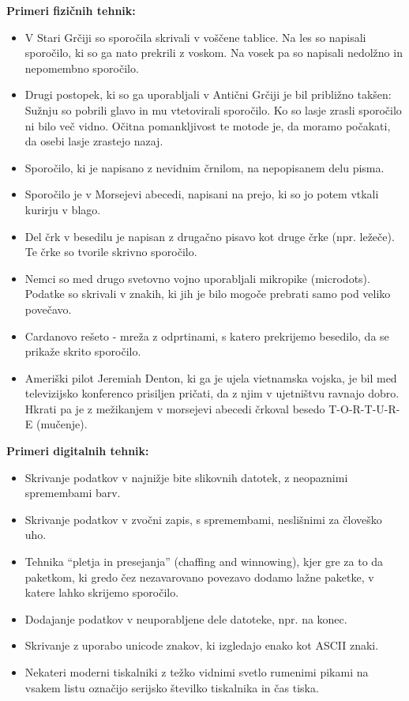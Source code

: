 \documentclass[a4paper, 12pt]{article}
\begin{document}
        \textbf{Primeri fizičnih tehnik:}
        \begin{itemize}
            \item V Stari Grčiji so sporočila skrivali v voščene tablice. Na les so napisali sporočilo, ki so ga nato prekrili z voskom. Na vosek pa so napisali nedolžno in nepomembno sporočilo.
            \item Drugi postopek, ki so ga uporabljali v Antični Grčiji je bil približno takšen: Sužnju so pobrili glavo in mu vtetovirali sporočilo. Ko so lasje zrasli sporočilo ni bilo več vidno. Očitna pomankljivost te motode je, da moramo počakati, da osebi lasje zrastejo nazaj.
            \item Sporočilo, ki je napisano z nevidnim črnilom, na nepopisanem delu pisma.
            \item Sporočilo je v Morsejevi abecedi, napisani na prejo, ki so jo potem vtkali kurirju  v blago.
            \item Del črk v besedilu je napisan z drugačno pisavo kot druge črke (npr. ležeče). Te črke so tvorile skrivno sporočilo. \cite{wikipedia}
            \item Nemci so med drugo svetovno vojno uporabljali mikropike (microdots). Podatke so skrivali v znakih, ki jih je bilo mogoče prebrati samo pod veliko povečavo. \cite{monitor}
            \item Cardanovo rešeto - mreža z odprtinami, s katero prekrijemo besedilo, da se prikaže skrito sporočilo.
            \item Ameriški pilot Jeremiah Denton, ki ga je ujela vietnamska vojska, je bil med televizijsko konferenco prisiljen pričati, da z njim v ujetništvu ravnajo dobro. Hkrati pa je z mežikanjem v morsejevi abecedi črkoval besedo T-O-R-T-U-R-E (mučenje).\cite{delo}
        \end{itemize}

        \textbf{Primeri digitalnih tehnik:}
        \begin{itemize}
            \item Skrivanje podatkov v najnižje bite slikovnih datotek, z neopaznimi spremembami barv.
            \item Skrivanje podatkov v zvočni zapis, s spremembami, neslišnimi za človeško uho.
            \item Tehnika ``pletja in presejanja'' (chaffing and winnowing), kjer gre za to da paketkom, ki gredo čez nezavarovano povezavo dodamo lažne paketke, v katere lahko skrijemo sporočilo.
            \item Dodajanje podatkov v neuporabljene dele datoteke, npr. na konec.
            \item Skrivanje z uporabo unicode znakov, ki izgledajo enako kot ASCII znaki.
            \item Nekateri moderni tiskalniki z težko vidnimi svetlo rumenimi pikami na vsakem listu označijo serijsko številko tiskalnika in čas tiska.
            \cite{wikipedia}
        \end{itemize}
\end{document}
